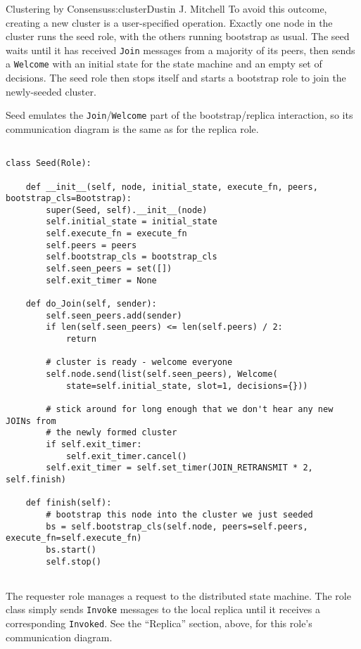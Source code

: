 \begin{aosachapter}{Clustering by Consensus}{s:cluster}{Dustin J. Mitchell}
To avoid this outcome, creating a new cluster is a user-specified
operation. Exactly one node in the cluster runs the seed role, with the
others running bootstrap as usual. The seed waits until it has received
\texttt{Join} messages from a majority of its peers, then sends a
\texttt{Welcome} with an initial state for the state machine and an
empty set of decisions. The seed role then stops itself and starts a
bootstrap role to join the newly-seeded cluster.

Seed emulates the \texttt{Join}/\texttt{Welcome} part of the
bootstrap/replica interaction, so its communication diagram is the same
as for the replica role.

\begin{verbatim}

class Seed(Role):

    def __init__(self, node, initial_state, execute_fn, peers, bootstrap_cls=Bootstrap):
        super(Seed, self).__init__(node)
        self.initial_state = initial_state
        self.execute_fn = execute_fn
        self.peers = peers
        self.bootstrap_cls = bootstrap_cls
        self.seen_peers = set([])
        self.exit_timer = None

    def do_Join(self, sender):
        self.seen_peers.add(sender)
        if len(self.seen_peers) <= len(self.peers) / 2:
            return

        # cluster is ready - welcome everyone
        self.node.send(list(self.seen_peers), Welcome(
            state=self.initial_state, slot=1, decisions={}))

        # stick around for long enough that we don't hear any new JOINs from
        # the newly formed cluster
        if self.exit_timer:
            self.exit_timer.cancel()
        self.exit_timer = self.set_timer(JOIN_RETRANSMIT * 2, self.finish)

    def finish(self):
        # bootstrap this node into the cluster we just seeded
        bs = self.bootstrap_cls(self.node, peers=self.peers, execute_fn=self.execute_fn)
        bs.start()
        self.stop()
    
\end{verbatim}

\label{requester}

The requester role manages a request to the distributed state machine.
The role class simply sends \texttt{Invoke} messages to the local
replica until it receives a corresponding \texttt{Invoked}. See the
``Replica'' section, above, for this role's communication diagram.


\end{aosachapter}
